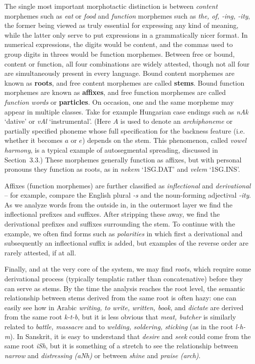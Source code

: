 The single most important morphotactic distinction is between {\it content}
morphemes such as {\it eat} or {\it food} and {\it function} morphemes such as
{\it the, of, -ing, -ity}, the former being viewed as truly essential for
expressing any kind of meaning, while the latter only serve to put expressions
in a grammatically nicer format. In numerical expressions, the digits would be
content, and the commas used to group digits in threes would be function
morphemes.  Between free or bound, content or function, all four combinations
are widely attested, though not all four are simultaneously present in every
language.  Bound content morphemes are known as {\bf roots}, and free content
morphemes are called {\bf stems}. Bound function morphemes are known as {\bf
  affixes}, and free function morphemes are called {\it function words} or
{\bf
  particles}.
On occasion, one and the same morpheme may appear in multiple classes. Take
for example Hungarian case endings such as {\it nAk} `dative' or {\it vAl}
`instrumental'. (Here $A$ is used to denote an {\it archiphoneme} or partially
specified phoneme whose full specification for the backness feature
(i.e. whether it becomes $a$ or $e$) depends on the stem. This phenomenon,
called {\it vowel harmony}, is a typical example of autosegmental spreading,
discussed in Section~3.3.) These morphemes generally function as affixes, but
with personal pronouns they function as roots, as in {\it nekem} `1SG.DAT' and
{\it velem} `1SG.INS'.

Affixes (function morphemes) are further classified as {\it inflectional} and
{\it derivational} -- for example, compare the English plural {\it -s} and the
noun-forming adjectival {\it -ity}.  As we analyze words from the outside in,
in the outermost layer we find the inflectional prefixes and suffixes.  After
stripping these away, we find the derivational prefixes and suffixes
surrounding the stem. To continue with the example, we often find forms such
as {\it polarities} in which first a derivational and subsequently an
inflectional suffix is added, but examples of the reverse order are rarely
attested, if at all.

Finally, and at the very core of the system, we may find {\it roots}, which
require some derivational process (typically templatic rather than
concatenative) before they can serve as stems. By the time the analysis
reaches the root level, the semantic relationship between stems derived from
the same root is often hazy: one can easily see how in Arabic {\it writing, to
write, written, book}, and {\it dictate} are derived from the same root {\it
k-t-b}, but it is less obvious that {\it meat, butcher} is similarly related
to {\it battle, massacre} and to {\it welding, soldering, sticking} (as in the
root {\it l-h-m}). In Sanskrit, it is easy to understand that {\it desire} and
{\it seek} could come from the same root {\it iSh}, but it is something of a
stretch to see the relationship between {\it narrow} and {\it distressing
(aNh)} or between {\it shine} and {\it praise (arch)}. 


